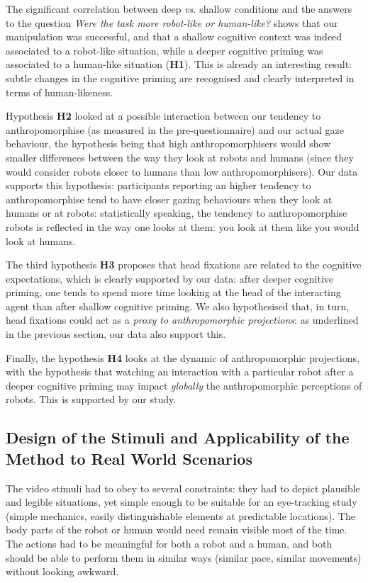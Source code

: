 \documentclass[lettersize, noapacite, twoside, HRI]{apa_HRI}
\newcommand{\vs}{\textit{vs.}\xspace}
\newcommand{\h}[1]{\textbf{H#1}\xspace}
\begin{document}
The significant correlation between deep \vs shallow conditions and the
answers to the question \emph{Were the task more robot-like or human-like?}
shows that our manipulation was successful, and that a shallow cognitive
context was indeed associated to a robot-like situation, while a deeper
cognitive priming was associated to a human-like situation (\h{1}). This is
already an interesting result: subtle changes in the cognitive priming are
recognised and clearly interpreted in terms of human-likeness.

Hypothesis \h{2} looked at a possible interaction between our tendency to
anthropomorphise (as measured in the pre-questionnaire) and our actual gaze
behaviour, the hypothesis being that high anthropomorphisers would show smaller
differences between the way they look at robots and humans (since they would
consider robots closer to humans than low anthropomorphisers). Our data supports
this hypothesis: participants reporting an higher tendency to anthropomorphise
tend to have closer gazing behaviours when they look at humans or at robots:
statistically speaking, the tendency to anthropomorphise robots
is reflected in the way one looks at them: you look at them
like you would look at humans.

The third hypothesis \h{3} proposes that head fixations are related to the
cognitive expectations, which is clearly supported by our data: after deeper cognitive
priming, one tends to spend more time looking at the head of the interacting
agent than after shallow cognitive priming. We also hypothesised that, in turn,
head fixations could act as a \emph{proxy to anthropomorphic projections}: as
underlined in the previous section, our data also support this.

Finally, the hypothesis \h{4} looks at the dynamic of anthropomorphic
projections, with the hypothesis that watching an interaction with a particular
robot after a deeper cognitive priming may impact \emph{globally} the
anthropomorphic perceptions of robots. This is supported by our study.

\subsection{Design of the Stimuli and Applicability of the Method to Real World
Scenarios}
\label{stimuli_design}

The video stimuli had to obey to several constraints: they had to depict
plausible and legible situations, yet simple enough to be suitable for an
eye-tracking study (simple mechanics, easily distinguishable elements at
predictable locations). The body parts of the robot or human would need remain
visible most of the time. The actions had to be meaningful for both a robot and
a human, and both should be able to perform them in similar ways (similar pace,
similar movements) without looking awkward.
\end{document}
